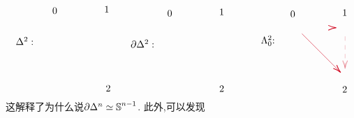 \[\begin{tikzpicture}[x=0.75pt,y=0.75pt,yscale=-1,xscale=1]
\draw [shift={(498.11,80.11)}, rotate = 180] [color={rgb, 255:red, 208; green, 2; blue, 27 }  ,draw opacity=1 ][line width=0.75]    (10.93,-3.29) .. controls (6.95,-1.4) and (3.31,-0.3) .. (0,0) .. controls (3.31,0.3) and (6.95,1.4) .. (10.93,3.29)   ;
\draw [color={rgb, 255:red, 208; green, 2; blue, 27 }  ,draw opacity=1 ]   (451.11,88.11) -- (502.7,139.7) ;
\draw [shift={(504.11,141.11)}, rotate = 225] [color={rgb, 255:red, 208; green, 2; blue, 27 }  ,draw opacity=1 ][line width=0.75]    (10.93,-3.29) .. controls (6.95,-1.4) and (3.31,-0.3) .. (0,0) .. controls (3.31,0.3) and (6.95,1.4) .. (10.93,3.29)   ;
\draw [color={rgb, 255:red, 208; green, 2; blue, 27 }  ,draw opacity=0.4 ] [dash pattern={on 4.5pt off 4.5pt}]  (510.11,91.78) -- (510.11,133.78) ;
\draw [shift={(510.11,135.78)}, rotate = 270] [color={rgb, 255:red, 208; green, 2; blue, 27 }  ,draw opacity=0.4 ][line width=0.75]    (10.93,-3.29) .. controls (6.95,-1.4) and (3.31,-0.3) .. (0,0) .. controls (3.31,0.3) and (6.95,1.4) .. (10.93,3.29)   ;
\draw (59,91.4) node [anchor=north west][inner sep=0.75pt]    {$\Delta ^{2} :$};
\draw (109,51.4) node [anchor=north west][inner sep=0.75pt]    {$0$};
\draw (180,49.4) node [anchor=north west][inner sep=0.75pt]    {$1$};
\draw (182,157.4) node [anchor=north west][inner sep=0.75pt]    {$2$};
\draw (216,94.96) node [anchor=north west][inner sep=0.75pt]    {$\partial \Delta ^{2} :$};
\draw (266,54.96) node [anchor=north west][inner sep=0.75pt]    {$0$};
\draw (337,52.96) node [anchor=north west][inner sep=0.75pt]    {$1$};
\draw (337,157.96) node [anchor=north west][inner sep=0.75pt]    {$2$};
\draw (394,89.4) node [anchor=north west][inner sep=0.75pt]    {$\Lambda _{0}^{2}$:};
\draw (434,55.96) node [anchor=north west][inner sep=0.75pt]    {$0$};
\draw (505,53.96) node [anchor=north west][inner sep=0.75pt]    {$1$};
\draw (505,158.96) node [anchor=north west][inner sep=0.75pt]    {$2$};
\end{tikzpicture}\]
这解释了为什么说$\partial \Delta^n \simeq \operatorname{\mathbb{S}}^{n-1}$.
此外,可以发现
